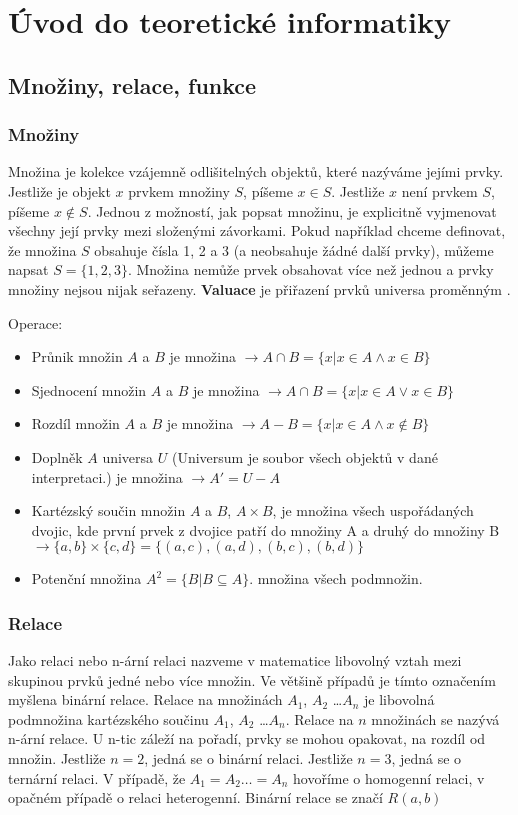 \section{Úvod do teoretické informatiky}
\subsection{Množiny, relace, funkce}
\subsubsection{Množiny}
Množina je kolekce vzájemně odlišitelných objektů, které nazýváme jejími prvky. Jestliže je objekt $x$ prvkem množiny $S$, píšeme $x \in S$. Jestliže $x$ není prvkem $S$, 
píšeme $x \notin S$.
Jednou z možností, jak popsat množinu, je explicitně vyjmenovat všechny její prvky mezi složenými závorkami. Pokud například chceme definovat, že množina $S$ obsahuje čísla 1, 2 a 3 (a neobsahuje žádné další prvky), můžeme napsat $S  = \{1, 2, 3\}$. Množina nemůže prvek obsahovat více než jednou a prvky množiny nejsou nijak seřazeny. \textbf{Valuace} je přiřazení prvků universa proměnným .

Operace:
\begin{itemize}
\item Průnik množin $A$ a $B$ je množina $\rightarrow A \cap B = \{x | x\in A \wedge x\in B \}$
\item Sjednocení množin $A$ a $B$ je množina $\rightarrow A \cap B = \{x | x\in A \vee x\in B \}$
\item Rozdíl množin $A$ a $B$ je množina $\rightarrow A-B = \{ x| x\in A \wedge x\notin B \}$
\item Doplněk $A$ universa $U$ (Universum je soubor všech objektů v dané interpretaci.) je množina $\rightarrow A' = U-A$
\item Kartézský součin množin $A$ a $B$, $A \times B$, je množina všech uspořádaných dvojic, kde první prvek z dvojice patří do množiny A a druhý do množiny B 
$\rightarrow \{a,b \}\times \{c,d\} = \{(a,c),(a,d),(b,c),(b,d)\}$
\item Potenční množina $A^2 = \{ B | B \subseteq A \}$. množina všech podmnožin. 
\end{itemize}

\subsubsection{Relace}
Jako relaci nebo n-ární relaci nazveme v matematice libovolný vztah mezi skupinou prvků jedné nebo více množin. Ve většině případů je tímto označením myšlena binární relace. Relace na množinách $A_1$, $A_2$ \ldots $A_n$ je libovolná podmnožina kartézského součinu $A_1$, $A_2$ \ldots $A_n$. Relace na $n$ množinách se nazývá n-ární relace. 
U n-tic záleží na pořadí, prvky se mohou opakovat, na rozdíl od množin. 
Jestliže $n = 2$, jedná se o binární relaci. Jestliže $n = 3$, jedná se o ternární relaci.
V případě, že $ A_1 = A_2 \ldots = A_n$  hovoříme o homogenní relaci, v opačném případě o relaci heterogenní. Binární relace se značí $R(a,b)$

